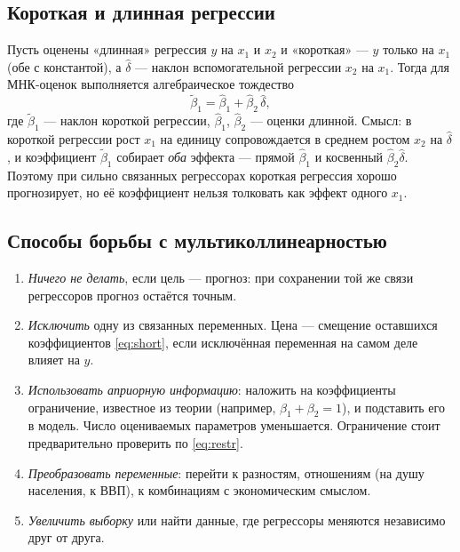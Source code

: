 \subsection{Короткая и длинная регрессии}\label{sec:short}

Пусть оценены «длинная» регрессия $y$ на $x_1$ и $x_2$ и «короткая» — $y$
только на $x_1$ (обе с константой), а $\widehat{\delta}$ — наклон
вспомогательной регрессии $x_2$ на $x_1$. Тогда для МНК-оценок выполняется
алгебраическое тождество
\begin{equation}
  \widetilde{\beta}_1 = \widehat{\beta}_1 + \widehat{\beta}_2\,\widehat{\delta},
  \label{eq:short}
\end{equation}
где $\widetilde{\beta}_1$ — наклон короткой регрессии, $\widehat{\beta}_1$,
$\widehat{\beta}_2$ — оценки длинной. Смысл: в короткой регрессии рост $x_1$
на единицу сопровождается в среднем ростом $x_2$ на $\widehat{\delta}$, и
коэффициент $\widetilde{\beta}_1$ собирает \emph{оба} эффекта — прямой
$\widehat{\beta}_1$ и косвенный $\widehat{\beta}_2\widehat{\delta}$. Поэтому
при сильно связанных регрессорах короткая регрессия хорошо прогнозирует, но
её коэффициент нельзя толковать как эффект одного $x_1$.

\subsection{Способы борьбы с мультиколлинеарностью}\label{sec:cure}

\begin{enumerate}[label=\arabic*), leftmargin=2.2em, itemsep=2pt]
  \item \emph{Ничего не делать}, если цель — прогноз: при сохранении той же
        связи регрессоров прогноз остаётся точным.
  \item \emph{Исключить} одну из связанных переменных. Цена — смещение
        оставшихся коэффициентов \eqref{eq:short}, если исключённая переменная
        на самом деле влияет на $y$.
  \item \emph{Использовать априорную информацию}: наложить на коэффициенты
        ограничение, известное из теории (например, $\beta_1 + \beta_2 = 1$), и
        подставить его в модель. Число оцениваемых параметров уменьшается.
        Ограничение стоит предварительно проверить по \eqref{eq:restr}.
  \item \emph{Преобразовать переменные}: перейти к разностям, отношениям
        (на душу населения, к ВВП), к комбинациям с экономическим смыслом.
  \item \emph{Увеличить выборку} или найти данные, где регрессоры меняются
        независимо друг от друга.
\end{enumerate}

